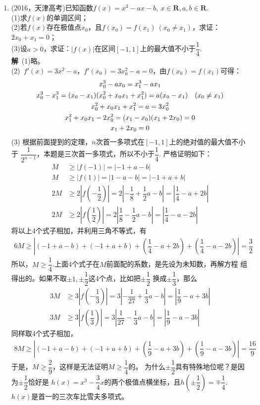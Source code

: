 \begin{enumerate}[label={【\textbf{例\thechapter.\arabic*}】},
 leftmargin=\inteval{\myenumleftmargin}pt,
 itemsep=\inteval{\myenumitempsep}pt,
 itemindent=\inteval{\myenumitemindent}pt]
\item (2016，天津高考)已知函数$ f(x)=x^3-ax-b,\ x\in \textbf{R},a,b\in 
\textbf{R} $.\\
(1)求$ f(x) $的单调区间；\\
(2)若$ f(x) $存在极值点$ x_0 $，且$ f(x_0)=f(x_1)\ (x_0\neq x_1) $，求证：$ 2x_0+x_1=0 $；\\
(3)设$ a>0 $，求证：$ |f(x)| $在区间$ [-1,1] $上的最大值不小于$ \dfrac{1}{4} $.\\
\textbf{解}\ (1)略。\\
(2)\ $ f'(x)=3x^2-a $，$ f'(x_0)=3x_0^2-a=0 $，由$ f(x_0)=f(x_1) $可得：
\begin{gather*}
    x_0^3-ax_0=x_1^3-ax_1 \\
    x_0^3-x_1^3=(x_0-x_1)(x_0^2+x_0x_1+x_1^2)=a(x_0-x_1)\quad (x_0\neq x_1) \\
    x_0^2+x_0x_1+x_1^2=a=3x_0^2 \\
    x_1^2+x_0x_1-2x_0^2=(x_1-x_0)(x_1+2x_0)=0 \\  
    x_1+2x_0=0
\end{gather*}  
(3) 根据前面提到的定理，$ n $次首一多项式在$ [-1,1] $上的绝对值的最大值不小于
$ \dfrac{1}{2^{n-1}} $，本题是三次首一多项式，所以不小于$ \dfrac{1}{4} $. 
严格证明如下：
\begin{align*}
    M&\geq |f(-1)|=|-1+a-b| \\
    M&\geq |f(1)|=|1-a-b|=|-1+a+b| \\
    2M&\geq 2|f(-\dfrac{1}{2})|=2|-\dfrac{1}{8}+\dfrac{1}{2}a-b|=
    |\dfrac{1}{4}-a+2b| \\
    2M&\geq 2|f( \dfrac{1}{2})|=2| \dfrac{1}{8}-\dfrac{1}{2}a-b|=
    |\dfrac{1}{4}-a-2b|	  
\end{align*}
将以上4个式子相加，并利用三角不等式，有
\begin{gather*}
    6M\geq |(-1+a-b)+(-1+a+b)+(\dfrac{1}{4}-a+2b)+(\dfrac{1}{4}-a-2b)|
    =\dfrac{3}{2}
\end{gather*}
所以，$ M\geq \dfrac{1}{4} $.上面4个式子在$ M $前面配的系数，是先设为未知数，再解方程
组得出的。如果不取$ \pm 1,\pm \dfrac{1}{2} $这4个点，比如把$ \pm \dfrac{1}{2} $
换成$ \pm \dfrac{1}{3} $，那么
\begin{align*}
    3M&\geq 3|f(-\dfrac{1}{3})|=3|-\dfrac{1}{27}+\dfrac{1}{3}a-b|=
    |\dfrac{1}{9}-a+3b| \\
    3M&\geq 3|f( \dfrac{1}{3})|=3| \dfrac{1}{27}-\dfrac{1}{3}a-b|=
    |\dfrac{1}{9}-a-3b|  
\end{align*}
同样取4个式子相加，
\begin{align*}
    8M\geq |(-1+a-b)+(-1+a+b)+(\dfrac{1}{9}-a+3b)+(\dfrac{1}{9}-a-3b)|=
    \dfrac{16}{9}
\end{align*}
于是，$ M\geq \dfrac{2}{9} $，这样是无法证明$ M\geq \dfrac{1}{4} $的。
为什么$ \pm \dfrac{1}{2} $具有特殊地位呢？是因为$ \pm \dfrac{1}{2} $恰好是
$ h(x)=x^3-\dfrac{3}{4}x $的两个极值点横坐标，且$ h(\pm\dfrac{1}{2})=\mp 
\dfrac{1}{4} $. $ h(x) $是首一的三次车比雪夫多项式。


\end{enumerate}
